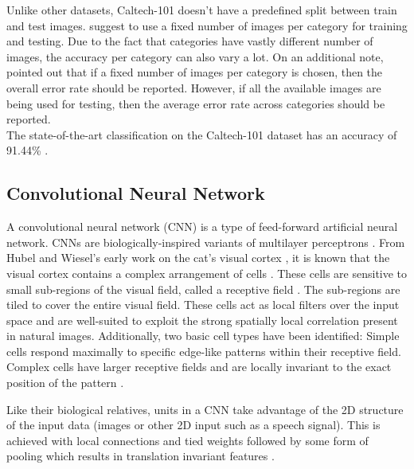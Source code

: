 \documentclass[a4paper, 11pt]{article}
\begin{document}
Unlike other datasets, Caltech-101 doesn't have a predefined split between train and test images.
\citet{Fei-Fei2007} suggest to use a fixed number of images per category for training and testing.
Due to the fact that categories have vastly different number of images, the accuracy per category can also vary a lot.
On an additional note, \cite{Fei-Fei2007} pointed out that if a fixed number of images per category is chosen, then the overall error rate should be reported.
However, if all the available images are being used for testing, then the average error rate across categories should be reported.\\

The state-of-the-art classification on the Caltech-101 dataset has an accuracy of 91.44\% \cite{He2014}.


\subsection{Convolutional Neural Network}
A convolutional neural network (CNN) is a type of feed-forward artificial neural network.
CNNs are biologically-inspired variants of multilayer perceptrons \cite{DLCNN}.
From Hubel and Wiesel's early work on the cat's visual cortex \cite{Hubel1968}, it is known that the visual cortex contains a complex arrangement of cells \cite{DLCNN}.
These cells are sensitive to small sub-regions of the visual field, called a receptive field \cite{DLCNN}.
The sub-regions are tiled to cover the entire visual field.
These cells act as local filters over the input space and are well-suited to exploit the strong spatially local correlation present in natural images.
Additionally, two basic cell types have been identified: Simple cells respond maximally to specific edge-like patterns within their receptive field.
Complex cells have larger receptive fields and are locally invariant to the exact position of the pattern \cite{DLCNN}.

Like their biological relatives, units in a CNN take advantage of the 2D structure of the input data (images or other 2D input such as a speech signal).
This is achieved with local connections and tied weights followed by some form of pooling which results in translation invariant features \cite{StanfordTutCNN2015}.
\end{document}
